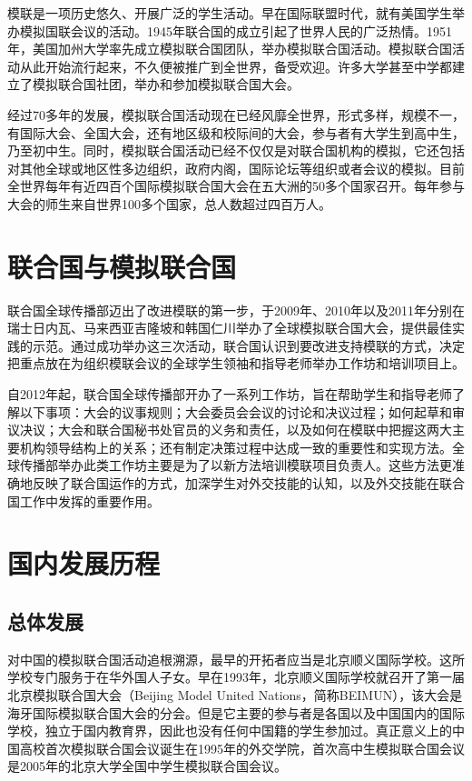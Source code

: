 \documentclass[a4paper,openany]{book}
\begin{document}
模联是一项历史悠久、开展广泛的学生活动。早在国际联盟时代，就有美国学生举办模拟国联会议的活动。1945年联合国的成立引起了世界人民的广泛热情。1951年，美国加州大学率先成立模拟联合国团队，举办模拟联合国活动。模拟联合国活动从此开始流行起来，不久便被推广到全世界，备受欢迎。许多大学甚至中学都建立了模拟联合国社团，举办和参加模拟联合国大会。

经过70多年的发展，模拟联合国活动现在已经风靡全世界，形式多样，规模不一，有国际大会、全国大会，还有地区级和校际间的大会，参与者有大学生到高中生，乃至初中生。同时，模拟联合国活动已经不仅仅是对联合国机构的模拟，它还包括对其他全球或地区性多边组织，政府内阁，国际论坛等组织或者会议的模拟。目前全世界每年有近四百个国际模拟联合国大会在五大洲的50多个国家召开。每年参与大会的师生来自世界100多个国家，总人数超过四百万人。

\section{联合国与模拟联合国}

联合国全球传播部迈出了改进模联的第一步，于2009年、2010年以及2011年分别在瑞士日内瓦、马来西亚吉隆坡和韩国仁川举办了全球模拟联合国大会，提供最佳实践的示范。通过成功举办这三次活动，联合国认识到要改进支持模联的方式，决定把重点放在为组织模联会议的全球学生领袖和指导老师举办工作坊和培训项目上。

自2012年起，联合国全球传播部开办了一系列工作坊，旨在帮助学生和指导老师了解以下事项：大会的议事规则；大会委员会会议的讨论和决议过程；如何起草和审议决议；大会和联合国秘书处官员的义务和责任，以及如何在模联中把握这两大主要机构领导结构上的关系；还有制定决策过程中达成一致的重要性和实现方法。全球传播部举办此类工作坊主要是为了以新方法培训模联项目负责人。这些方法更准确地反映了联合国运作的方式，加深学生对外交技能的认知，以及外交技能在联合国工作中发挥的重要作用。

\section{国内发展历程}

\subsection{总体发展}

对中国的模拟联合国活动追根溯源，最早的开拓者应当是北京顺义国际学校。这所学校专门服务于在华外国人子女。早在1993年，北京顺义国际学校就召开了第一届北京模拟联合国大会（Beijing Model United Nations，简称BEIMUN），该大会是海牙国际模拟联合国大会的分会。但是它主要的参与者是各国以及中国国内的国际学校，独立于国内教育界，因此也没有任何中国籍的学生参加过。真正意义上的中国高校首次模拟联合国会议诞生在1995年的外交学院，首次高中生模拟联合国会议是2005年的北京大学全国中学生模拟联合国会议。
\end{document}
